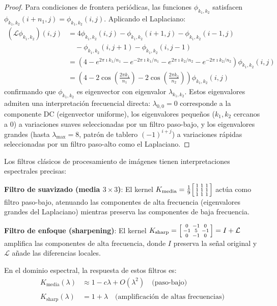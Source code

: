 \begin{proof}
Para condiciones de frontera periódicas, las funciones $\phi_{k_1,k_2}$ satisfacen $\phi_{k_1,k_2}(i + n_1, j) = \phi_{k_1,k_2}(i,j)$. Aplicando el Laplaciano:
\begin{align}
(\mathcal{L}\phi_{k_1,k_2})(i,j) &= 4\phi_{k_1,k_2}(i,j) - \phi_{k_1,k_2}(i+1,j) - \phi_{k_1,k_2}(i-1,j) \nonumber \\
&\quad - \phi_{k_1,k_2}(i,j+1) - \phi_{k_1,k_2}(i,j-1) \\
&= \left(4 - e^{2\pi \imath k_1/n_1} - e^{-2\pi \imath k_1/n_1} - e^{2\pi \imath k_2/n_2} - e^{-2\pi \imath k_2/n_2}\right)\phi_{k_1,k_2}(i,j) \\
&= \left(4 - 2\cos\!\left(\frac{2\pi k_1}{n_1}\right) - 2\cos\!\left(\frac{2\pi k_2}{n_2}\right)\right)\phi_{k_1,k_2}(i,j)
\end{align}
confirmando que $\phi_{k_1,k_2}$ es eigenvector con eigenvalor $\lambda_{k_1,k_2}$. Estos eigenvalores admiten una interpretación frecuencial directa: $\lambda_{0,0} = 0$ corresponde a la componente DC (eigenvector uniforme), los eigenvalores pequeños ($k_1, k_2$ cercanos a $0$) a variaciones suaves seleccionadas por un filtro paso-bajo, y los eigenvalores grandes (hasta $\lambda_{\max} = 8$, patrón de tablero $(-1)^{i+j}$) a variaciones rápidas seleccionadas por un filtro paso-alto como el Laplaciano.
\end{proof}

\begin{example}\label{ex:filtros_paso_bajo_alto}
Los filtros clásicos de procesamiento de imágenes tienen interpretaciones espectrales precisas:

\textbf{Filtro de suavizado (media $3 \times 3$)}: El kernel $K_{\text{media}} = \frac{1}{9}\begin{bsmallmatrix} 1 & 1 & 1 \\ 1 & 1 & 1 \\ 1 & 1 & 1 \end{bsmallmatrix}$ actúa como filtro paso-bajo, atenuando las componentes de alta frecuencia (eigenvalores grandes del Laplaciano) mientras preserva las componentes de baja frecuencia.

\textbf{Filtro de enfoque (sharpening)}: El kernel $K_{\text{sharp}} = \begin{bsmallmatrix} 0 & -1 & 0 \\ -1 & 5 & -1 \\ 0 & -1 & 0 \end{bsmallmatrix} = I + \mathcal{L}$ amplifica las componentes de alta frecuencia, donde $I$ preserva la señal original y $\mathcal{L}$ añade las diferencias locales.

En el dominio espectral, la respuesta de estos filtros es:
\begin{align}
\hat{K}_{\text{media}}(\lambda) &\approx 1 - c\lambda + O(\lambda^2) \quad \text{(paso-bajo)} \\
\hat{K}_{\text{sharp}}(\lambda) &= 1 + \lambda \quad \text{(amplificación de altas frecuencias)}
\end{align}
\end{example}

